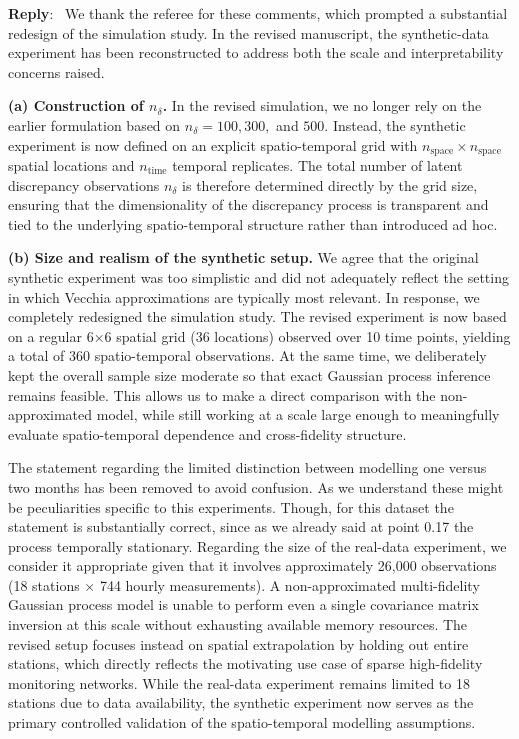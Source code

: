 \documentclass[12pt]{article}
\newcommand{\0}{\mathbf{0}}
\newcounter{reviewer}
\newcounter{point}[reviewer]
\newenvironment{reply}
   {\medskip \noindent \begin{sf}\color{Blue}\textbf{Reply}:\  }
   {\medskip \end{sf}}
\begin{document}
\begin{reply}
    We thank the referee for these comments, which prompted a substantial redesign of the 
simulation study. In the revised manuscript, the synthetic-data experiment has been 
reconstructed to address both the scale and interpretability concerns raised.

\medskip
\textbf{(a) Construction of $n_\delta$.}  
In the revised simulation, we no longer rely on the earlier formulation based on 
$n_\delta = 100, 300,$ and $500$. Instead, the synthetic experiment is now defined on an 
explicit spatio-temporal grid with $n_{\text{space}} \times n_{\text{space}}$ spatial 
locations and $n_{\text{time}}$ temporal replicates. The total number of latent 
discrepancy observations $n_\delta$ is therefore determined directly by the grid size, 
ensuring that the dimensionality of the discrepancy process is transparent and tied to 
the underlying spatio-temporal structure rather than introduced ad hoc.

\medskip
\textbf{(b) Size and realism of the synthetic setup.}  
We agree that the original synthetic experiment was too simplistic and did not adequately reflect the setting in which Vecchia approximations are typically most relevant. In response, we completely redesigned the simulation study. The revised experiment is now based on a regular 
6×6 spatial grid (36 locations) observed over 10 time points, yielding a total of 360 spatio-temporal observations. At the same time, we deliberately kept the overall sample size moderate so that exact Gaussian process inference remains feasible. This allows us to make a direct comparison with the non-approximated model, while still working at a scale large enough to meaningfully evaluate spatio-temporal dependence and cross-fidelity structure.

The statement regarding the limited distinction between modelling one versus two months has been removed to avoid confusion. As we understand these might be peculiarities specific to this experiments.
Though, for this dataset  the statement is substantially correct, since as we already said at point 0.17 the process temporally stationary.
Regarding the size of the real-data experiment, we consider it appropriate given that it involves approximately 26,000 observations (18 stations × 744 hourly measurements). A non-approximated multi-fidelity Gaussian process model is unable to perform even a single covariance matrix inversion at this scale without exhausting available memory resources. The revised setup focuses instead on spatial 
extrapolation by holding out entire stations, which directly reflects the motivating use 
case of sparse high-fidelity monitoring networks. While the real-data experiment remains 
limited to 18 stations due to data availability, the synthetic experiment now serves as 
the primary controlled validation of the spatio-temporal modelling assumptions.


\end{reply}
\end{document}
